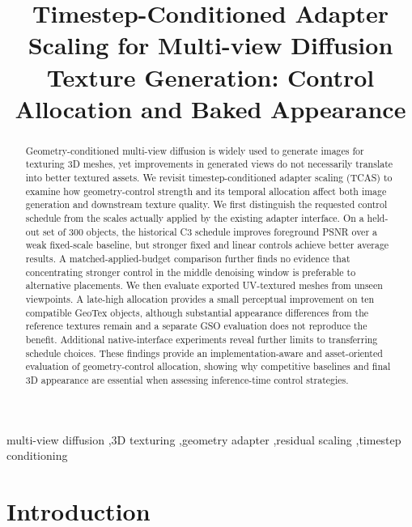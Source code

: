 \documentclass[times,twocolumn,final]{elsarticle}
\begin{document}
\begin{frontmatter}

\title{Timestep-Conditioned Adapter Scaling for Multi-view Diffusion Texture Generation: Control Allocation and Baked Appearance}


\begin{abstract}
Geometry-conditioned multi-view diffusion is widely used to generate images for texturing 3D meshes, yet improvements in generated views do not necessarily translate into better textured assets. We revisit timestep-conditioned adapter scaling (TCAS) to examine how geometry-control strength and its temporal allocation affect both image generation and downstream texture quality. We first distinguish the requested control schedule from the scales actually applied by the existing adapter interface. On a held-out set of 300 objects, the historical C3 schedule improves foreground PSNR over a weak fixed-scale baseline, but stronger fixed and linear controls achieve better average results. A matched-applied-budget comparison further finds no evidence that concentrating stronger control in the middle denoising window is preferable to alternative placements. We then evaluate exported UV-textured meshes from unseen viewpoints. A late-high allocation provides a small perceptual improvement on ten compatible GeoTex objects, although substantial appearance differences from the reference textures remain and a separate GSO evaluation does not reproduce the benefit. Additional native-interface experiments reveal further limits to transferring schedule choices. These findings provide an implementation-aware and asset-oriented evaluation of geometry-control allocation, showing why competitive baselines and final 3D appearance are essential when assessing inference-time control strategies.


\end{abstract}

\begin{keyword}
\KWD
multi-view diffusion \sep 3D texturing \sep geometry adapter \sep residual scaling \sep timestep conditioning
\end{keyword}

\end{frontmatter}

\raggedbottom
\linenumbers

\section{Introduction}
\label{sec:intro}
\end{document}
